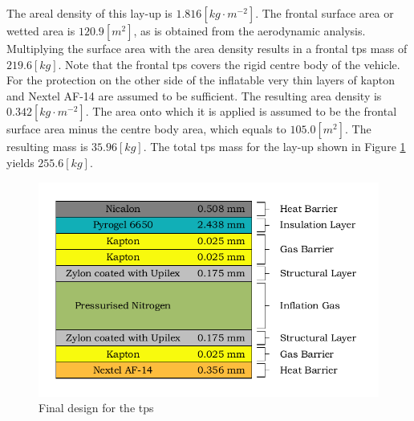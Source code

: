 The areal density of this lay-up is $1.816 \left[kg\cdot m^{-2}\right]$. The frontal surface area or wetted area is $120.9 \left[m^2\right]$, as is obtained from the aerodynamic analysis. Multiplying the surface area with the area density results in a frontal \gls{tps} mass of $219.6 \left[kg\right]$. Note that the frontal \gls{tps} covers the rigid centre body of the vehicle. For the protection on the other side of the inflatable very thin layers of kapton and Nextel AF-14 are assumed to be sufficient. The resulting area density is $0.342 \left[kg\cdot m^{-2}\right]$. The area onto which it is applied is assumed to be the frontal surface area minus the centre body area, which equals to $105.0 \left[m^2\right]$. The resulting mass is $35.96 \left[kg\right]$. The total \gls{tps} mass for the lay-up shown in Figure \ref{fig:finallayup} yields $255.6 \left[kg\right]$. 

\begin{figure}[H]
	\centering
	\includegraphics{./Figure/Thermal/finallayup.pdf}
	\caption{Final design for the \acrlong{tps}}
	\label{fig:finallayup}
\end{figure}
